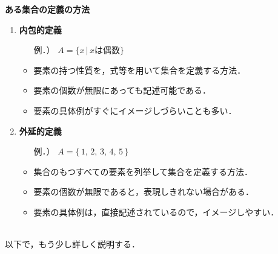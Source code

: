                         \begin{itembox}[l]{\textbf{ある集合の定義の方法}}
                            \begin{enumerate}
                                \item \textbf{内包的定義}
                                    \begin{itemize}
                                        \item[例．）] $A=\{ x \,| \, x \mbox{は偶数} \}$
                                        \item 要素の持つ性質を，式等を用いて集合を定義する方法．
                                        \item 要素の個数が無限にあっても記述可能である．
                                        \item 要素の具体例がすぐにイメージしづらいことも多い．
                                    \end{itemize}
                                \item \textbf{外延的定義}
                                    \begin{itemize}
                                        \item[例．）] $A=\{ \,1,\,2,\,3,\,4,\,5\,\}$
                                        \item 集合のもつすべての要素を列挙して集合を定義する方法．
                                        \item 要素の個数が無限であると，表現しきれない場合がある．
                                        \item 要素の具体例は，直接記述されているので，イメージしやすい．
                                    \end{itemize}
                            \end{enumerate}
                        \end{itembox}
                        \\
                    以下で，もう少し詳しく説明する．

